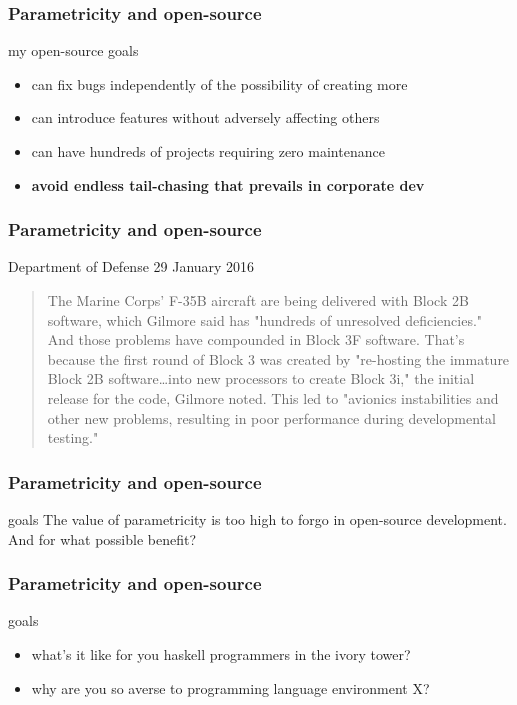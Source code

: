\begin{frame}[fragile]
\frametitle{Parametricity and open-source}
\begin{block}{my open-source goals}
\begin{itemize}
  \item can fix bugs independently of the possibility of creating more
  \item can introduce features without adversely affecting others
  \item can have hundreds of projects requiring zero maintenance
  \item \textbf{avoid endless tail-chasing that prevails in corporate dev}
\end{itemize}
\end{block}
\end{frame}

\begin{frame}[fragile]
\frametitle{Parametricity and open-source}
\begin{block}{Department of Defense 29 January 2016}
\begin{quotation}
The Marine Corps' F-35B aircraft are being delivered with Block 2B software, which Gilmore said has "hundreds of unresolved deficiencies." And those problems have compounded in Block 3F software. That's because the first round of Block 3 was created by "re-hosting the immature Block 2B software…into new processors to create Block 3i," the initial release for the code, Gilmore noted. This led to "avionics instabilities and other new problems, resulting in poor performance during developmental testing."
\end{quotation}
\end{block}
\end{frame}


\begin{frame}[fragile]
\frametitle{Parametricity and open-source}
\begin{block}{goals}
The value of parametricity is too high to forgo in open-source development. And for what possible benefit?
\end{block}
\end{frame}

\begin{frame}[fragile]
\frametitle{Parametricity and open-source}
\begin{block}{goals}
\begin{itemize}
  \item what's it like for you haskell programmers in the ivory tower?
  \item why are you so averse to programming language environment X?
\end{itemize}
\end{block}
\end{frame}
